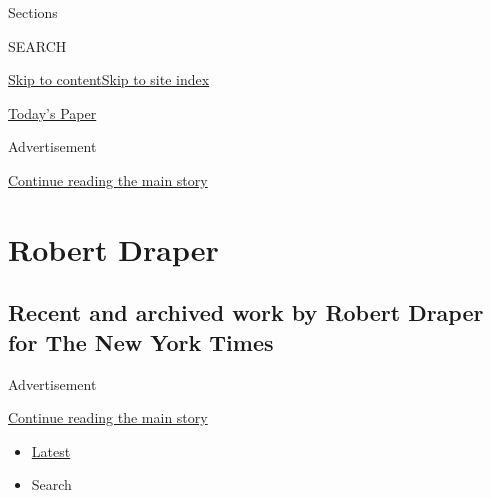 Sections

SEARCH

\protect\hyperlink{site-content}{Skip to
content}\protect\hyperlink{site-index}{Skip to site index}

\href{https://myaccount.nytimes.com/auth/login?response_type=cookie\&client_id=vi}{}

\href{https://www.nytimes.com/section/todayspaper}{Today's Paper}

Advertisement

\protect\hyperlink{after-top}{Continue reading the main story}

\hypertarget{robert-draper}{%
\section{Robert Draper}\label{robert-draper}}

\hypertarget{recent-and-archived-work-by-robert-draper-for-the-new-york-times}{%
\subsection{Recent and archived work by Robert Draper for The New York
Times}\label{recent-and-archived-work-by-robert-draper-for-the-new-york-times}}

Advertisement

\protect\hyperlink{after-mid1}{Continue reading the main story}

\begin{itemize}
\tightlist
\item
  \protect\hyperlink{stream-panel}{Latest}
\item
  Search
\end{itemize}

